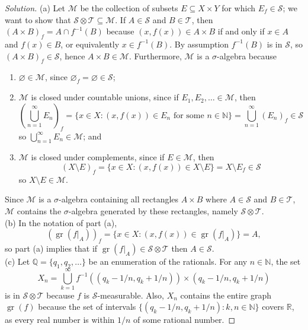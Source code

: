 \documentclass[10pt]{article}
\providecommand{\NN}{\mathbb N}
\providecommand{\QQ}{\mathbb Q}
\providecommand{\RR}{\mathbb R}
\providecommand{\ii}{\item}
\providecommand{\inv}{^{-1}}
\newenvironment{soln}{\begin{proof}[Solution]}{\end{proof}}
\providecommand{\gr}{\operatorname{gr}}
\begin{document}
\begin{soln}
    (a) Let $\mathcal M$ be the collection of subsets $E\subseteq X\times Y$
    for which $E_f\in\mathcal S$; we want to show that
    $\mathcal S\otimes\mathcal T\subseteq\mathcal M$.
    If $A\in\mathcal S$ and $B\in\mathcal T$,
    then $(A\times B)_f = A\cap f\inv(B)$ because
    $(x,f(x))\in A\times B$ if and only if
    $x\in A$ and $f(x)\in B$, or equivalently $x\in f\inv(B)$.
    By assumption $f\inv(B)$ is in $\mathcal S$, so $(A\times B)_f\in\mathcal S$,
    hence $A\times B\in\mathcal M$.
    Furthermore, $\mathcal M$ is a $\sigma$-algebra because
    \begin{enumerate}[(1)]
	\ii $\varnothing\in\mathcal M$,
	since $\varnothing_f = \varnothing\in\mathcal S$;
	\ii $\mathcal M$ is closed under countable unions,
	since if $E_1,E_2,\ldots\in\mathcal M$, then
	\begin{equation*}
	    \left(\bigcup_{n=1}^\infty E_n\right)_f
	    = \{x\in X : (x,f(x))\in E_n\text{ for some }n\in\NN\}
	    = \bigcup_{n=1}^\infty (E_n)_f\in\mathcal S
	\end{equation*}
	so $\bigcup_{n=1}^\infty E_n\in\mathcal M$; and
	\ii $\mathcal M$ is closed under complements,
	since if $E\in\mathcal M$, then
	\begin{equation*}
	    (X\setminus E)_f
	    = \{x\in X : (x,f(x))\in X\setminus E\}
	    = X\setminus E_f\in\mathcal S
	\end{equation*}
	so $X\setminus E\in\mathcal M$.
    \end{enumerate}
    Since $\mathcal M$ is a $\sigma$-algebra containing
    all rectangles $A\times B$ where $A\in\mathcal S$ and $B\in\mathcal T$,
    $\mathcal M$ contains the $\sigma$-algebra generated
    by these rectangles, namely $\mathcal S\otimes\mathcal T$.
    \\

    (b) In the notation of part (a),
    \begin{equation*}
	(\gr(f|_A))_f = \{x\in X : (x,f(x))\in\gr(f|_A)\} = A,
    \end{equation*}
    so part (a) implies that if $\gr(f|_A)\in\mathcal S\otimes\mathcal T$
    then $A\in\mathcal S$.
    \\

    (c) Let $\QQ = \{q_1,q_2,\ldots\}$ be an enumeration of the rationals.
    For any $n\in\NN$, the set
    \begin{equation*}
	X_n = \bigcup_{k=1}^\infty f\inv((q_k-1/n, q_k+1/n))\times
	(q_k-1/n, q_k+1/n)
    \end{equation*}
    is in $\mathcal S\otimes\mathcal T$ because $f$ is $\mathcal S$-measurable.
    Also, $X_n$ contains the entire graph $\gr(f)$
    because the set of intervals $\{(q_k-1/n, q_k+1/n) : k,n\in\NN\}$
    covers $\RR$, as every real number is within $1/n$ of some rational number.


\end{soln}
\end{document}
